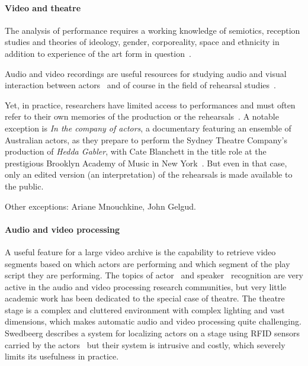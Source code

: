\documentclass[conference]{IEEEtran}
\begin{document}
\paragraph*{Video and theatre}

The analysis of performance requires a working knowledge of semiotics, reception studies and theories 
of ideology, gender, corporeality, space and ethnicity in addition to experience of the art form in question~\cite{Auslander97,Counsell01}.

Audio and video recordings are useful resources for studying audio and visual interaction between actors~\cite{Fitzpatrick90}
and of course in the field of rehearsal studies~\cite{McAuley98a,McAuley98b,McAuley06,McAuley08}.

Yet, in practice, researchers have limited access to performances and must often refer to their own memories of the production or the rehearsals~\cite{Selbourne82,Sher85,Stafford00,Stern00}. A notable exception is {\em In the company of actors}, a documentary featuring an ensemble of Australian actors, as they prepare to perform the Sydney Theatre Company's production of \emph{Hedda Gabler}, with Cate Blanchett in the title role at the prestigious Brooklyn Academy of Music  in New York~\cite{Darling07}. But even in that case, only an edited version (an interpretation)  of the rehearsals is made available to the public. 



Other exceptions: Ariane Mnouchkine, John Gelgud.



\paragraph*{Audio and video processing}
A useful feature for a large video archive is the capability to retrieve video segments based on which actors 
are performing and which segment of the play script they are performing. The topics of actor~\cite{Hilton06} and speaker~\cite{Miro12} recognition are very active in the audio and video processing research communities, but very little academic 
work has been dedicated to the special case of theatre. The theatre stage is a complex and cluttered environment 
with complex lighting and vast dimensions, which makes automatic audio and video processing quite challenging. 
Swedbeerg describes a system for localizing actors on a stage using RFID sensors carried by the actors~\cite{Swedberg}
but their system is intrusive and costly, which severely limits its usefulness in practice.
\end{document}
